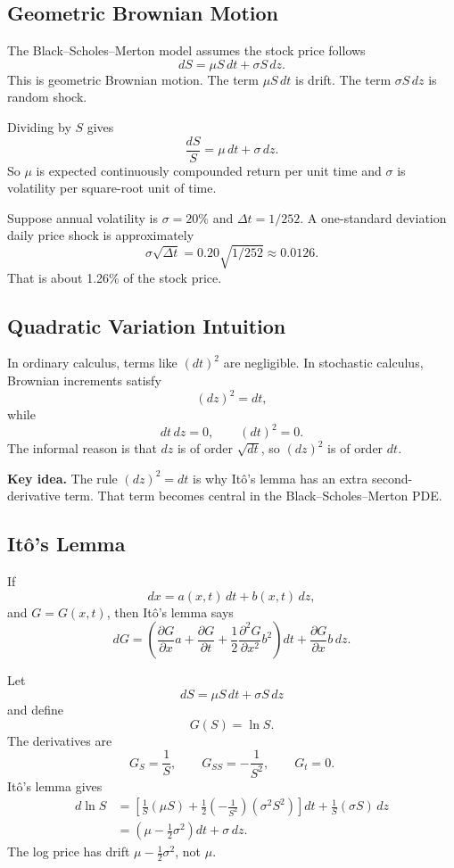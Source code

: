 \subsection{Geometric Brownian Motion}

The Black--Scholes--Merton model assumes the stock price follows
\[
    dS = \mu S\,dt+\sigma S\,dz.
\]
This is geometric Brownian motion. The term $\mu S\,dt$ is drift. The term
$\sigma S\,dz$ is random shock.

Dividing by $S$ gives
\[
    \frac{dS}{S}=\mu\,dt+\sigma\,dz.
\]
So $\mu$ is expected continuously compounded return per unit time and $\sigma$
is volatility per square-root unit of time.

\begin{exmp}
Suppose annual volatility is $\sigma=20\%$ and $\Delta t=1/252$. A one-standard
deviation daily price shock is approximately
\[
    \sigma\sqrt{\Delta t}=0.20\sqrt{1/252}\approx 0.0126.
\]
That is about 1.26\% of the stock price.
\end{exmp}

\subsection{Quadratic Variation Intuition}

In ordinary calculus, terms like $(dt)^2$ are negligible. In stochastic
calculus, Brownian increments satisfy
\[
    (dz)^2=dt,
\]
while
\[
    dt\,dz=0,
    \qquad
    (dt)^2=0.
\]
The informal reason is that $dz$ is of order $\sqrt{dt}$, so $(dz)^2$ is of
order $dt$.

\begin{boxD}
\textbf{Key idea.} The rule $(dz)^2=dt$ is why It\^o's lemma has an extra
second-derivative term. That term becomes central in the Black--Scholes--Merton
PDE.
\end{boxD}

\subsection{It\^o's Lemma}

If
\[
    dx=a(x,t)\,dt+b(x,t)\,dz,
\]
and $G=G(x,t)$, then It\^o's lemma says
\[
    dG=
    \left(
    \frac{\partial G}{\partial x}a
    +\frac{\partial G}{\partial t}
    +\frac{1}{2}\frac{\partial^2G}{\partial x^2}b^2
    \right)dt
    +
    \frac{\partial G}{\partial x}b\,dz.
\]

\begin{exmp}
Let
\[
    dS=\mu S\,dt+\sigma S\,dz
\]
and define
\[
    G(S)=\ln S.
\]
The derivatives are
\[
    G_S=\frac{1}{S},
    \qquad
    G_{SS}=-\frac{1}{S^2},
    \qquad
    G_t=0.
\]
It\^o's lemma gives
\[
\begin{aligned}
    d\ln S
    &=
    \left[
    \frac{1}{S}(\mu S)
    +\frac{1}{2}\left(-\frac{1}{S^2}\right)(\sigma^2S^2)
    \right]dt
    +
    \frac{1}{S}(\sigma S)\,dz\\
    &=
    \left(\mu-\frac{1}{2}\sigma^2\right)dt+\sigma\,dz.
\end{aligned}
\]
The log price has drift $\mu-\frac{1}{2}\sigma^2$, not $\mu$.
\end{exmp}

